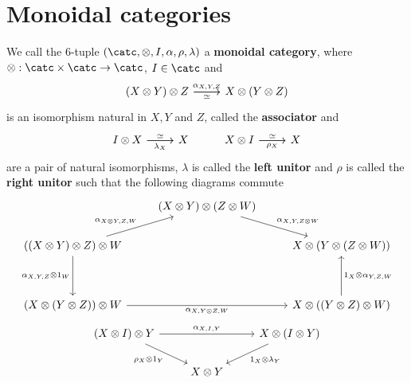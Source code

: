 \section{Monoidal categories}

\begin{definition}
	We call the $6$-tuple $(\catc, \otimes,I, \alpha, \rho, \lambda)$ a 
	\textbf{monoidal category}, where $\otimes: \catc\times\catc \to \catc$, $I\in\catc$ and
\[\begin{tikzcd}
	{(X\otimes Y)\otimes Z} & {X\otimes(Y\otimes Z)}
	\arrow["\simeq"', from=1-1, to=1-2]
	\arrow["{\alpha_{X,Y,Z}}", from=1-1, to=1-2]
\end{tikzcd}\]
	is an isomorphism natural in $X,Y$ and $Z$, called the \textbf{associator} and
\[\begin{tikzcd}
	{I\otimes X} & X & {X\otimes I} & X
	\arrow["\simeq", from=1-1, to=1-2]
	\arrow["{\lambda_X}"', from=1-1, to=1-2]
	\arrow["{\rho_X}"', from=1-3, to=1-4]
	\arrow["\simeq", from=1-3, to=1-4]
\end{tikzcd}\]
	are a pair of natural isomorphisms, $\lambda$ is called the \textbf{left unitor}
	and $\rho$ is called the \textbf{right unitor} such that the following diagrams commute
\[\begin{tikzcd}
	& {(X\otimes Y)\otimes(Z\otimes W)} \\
	{((X\otimes Y)\otimes Z)\otimes W} && {X\otimes(Y\otimes(Z\otimes W))} \\
	\\
	{(X\otimes(Y\otimes Z))\otimes W} && {X\otimes((Y\otimes Z)\otimes W)}
	\arrow["{\alpha_{X,Y,Z\otimes W}}", from=1-2, to=2-3]
	\arrow["{\alpha_{X\otimes Y,Z,W}}", from=2-1, to=1-2]
	\arrow["{\alpha_{X,Y,Z}\otimes 1_W}"', from=2-1, to=4-1]
	\arrow["{\alpha_{X,Y\otimes Z, W}}"', from=4-1, to=4-3]
	\arrow["{1_X\otimes\alpha_{Y,Z,W}}"', from=4-3, to=2-3]
\end{tikzcd}\]
\[\begin{tikzcd}
	{(X\otimes I) \otimes Y} && {X\otimes (I\otimes Y)} \\
	& {X\otimes Y}
	\arrow["{{\alpha_{X,I,Y}}}", from=1-1, to=1-3]
	\arrow["{{\rho_X \otimes 1_Y}}"', from=1-1, to=2-2]
	\arrow["{{1_X\otimes \lambda_Y}}", from=1-3, to=2-2]
\end{tikzcd}\]
\end{definition}
